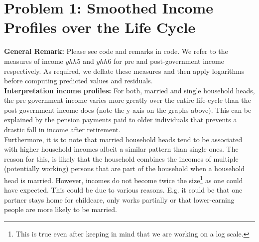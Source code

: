 \documentclass[12pt,a4paper]{article}
\begin{document}
\newpage


\section*{Problem 1: Smoothed Income Profiles over the Life Cycle}

\textbf{General Remark:} Please see code and remarks in code. We refer to the measures of income $yhh5$ and $yhh6$ for pre and post-government income respectively. As required, we deflate these measures and then apply logarithms before computing predicted values and residuals. \\

\textbf{Interpretation income profiles:} For both, married and single household heads, the pre government income varies more greatly over the entire life-cycle than the post government income does (note the y-axis on the graphs above). This can be explained by the pension payments paid to older individuals that prevents a drastic fall in income after retirement. \\ Furthermore, it is to note that married household heads tend to be associated with higher household incomes albeit a similar pattern than single ones. The reason for this, is likely that the household combines the incomes of multiple (potentially working) persons that are part of the household when a household head is married. However, incomes do not become twice the size\footnote{This is true even after keeping in mind that we are working on a log scale.} as one could have expected. This could be due to various reasons. E.g. it could be that one partner stays home for childcare, only works partially or that lower-earning people are more likely to be married. \\
\end{document}
